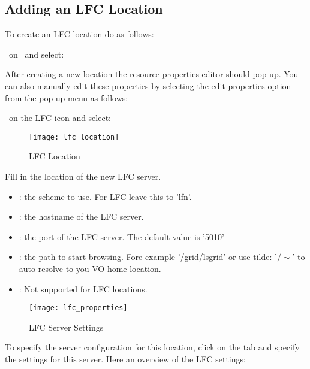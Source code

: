 \subsection{Adding an LFC Location} 
\label{section:adding_lfc_server} 

To create an LFC \cite{10.1109/HPDC.2005.1520941} location do as follows:

	\step \rightclick\ on \myvle\ and select: \rarr {}

 After creating a new location the resource properties editor should pop-up. 
 You can also manually edit these properties by selecting the edit properties
 option from the pop-up menu as follows: 

	\step \rightclick\ on the LFC icon and select: 

\begin{figure}[htbp]
\centerline{\texttt{[image: lfc\_location]}}
\caption{LFC Location}
\label{fig:lfc_location}
\end{figure}

Fill in the location of the new LFC server.

\begin{itemize}
\item {} : the scheme to use. For LFC leave this to 'lfn'.
\item {}  : the hostname of the LFC server. 
\item {}  : the port of the LFC server. The default value is '5010'
\item {}  : the path to start browsing. Fore example '/grid/lsgrid' or 
                     use tilde: '$/\sim$' to auto resolve to you VO home location. 
                        
\item {}  : Not supported for LFC locations.  
\end{itemize}

 \begin{figure}[htbp]
  \centerline{\texttt{[image: lfc\_properties]}}
  \caption{LFC Server Settings}
  \label{fig:lfc_properties}
 \end{figure}

To specify the server configuration for this location, click on the
 tab and specify the settings for this server. 
Here an overview of the LFC settings:

